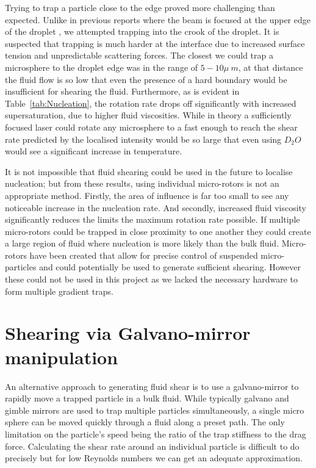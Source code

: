 Trying to trap a particle close to the edge proved more challenging than 
expected. Unlike in previous reports where the beam is focused at the upper
edge of the droplet \cite{Liao2022, Yuyama2010, Sugiyama2022}, we attempted 
trapping into the crook of the droplet. It is suspected that trapping is 
much harder at the interface due to increased surface tension and unpredictable
scattering forces. The closest we could trap a microsphere to the droplet edge 
was in the range of $5-10\mu\ m$, at that distance the fluid flow is so low that 
even the presence of a hard boundary would be insufficient for shearing the 
fluid. Furthermore, as is evident in Table~\ref{tab:Nucleation}, the rotation 
rate drops off significantly with increased supersaturation, due to higher 
fluid viscosities. While in theory a sufficiently focused laser could rotate any microsphere to a fast enough to reach the shear rate predicted by \cite{Debuysschere2023} the localised intensity would be so large that even 
using $D_2O$ would see a significant increase in temperature. 

It is not impossible that fluid shearing could be used in the future to 
localise nucleation; but from these results, using individual micro-rotors 
is not an appropriate method. Firstly, the area of influence is far too small 
to see any noticeable increase in the nucleation rate. And secondly, increased 
fluid viscosity significantly reduces the limits the maximum rotation rate 
possible. If multiple micro-rotors could be trapped in close proximity to one 
another they could create a large region of fluid where nucleation is more likely than the bulk fluid. Micro-rotors have been created that allow for precise
control of suspended micro-particles \cite{Butaite2019} and could potentially be
used to generate sufficient shearing. However these could not be used in this 
project as we lacked the necessary hardware to form multiple gradient traps.  

\section{Shearing via Galvano-mirror manipulation}
An alternative approach to generating fluid shear is to use a galvano-mirror
to rapidly move a trapped particle in a bulk fluid. While typically galvano and gimble mirrors are used to trap multiple particles simultaneously, a single micro sphere can be moved quickly through a fluid along a preset path. The only 
limitation on the particle's speed being the ratio of the trap stiffness to
the drag force. Calculating the shear rate around an individual particle is 
difficult to do precisely but for low Reynolds numbers we can get an adequate approximation.

